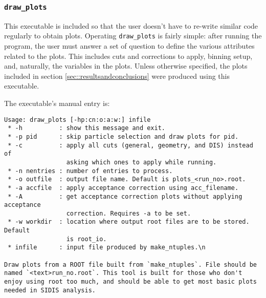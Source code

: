 \subsubsection{\texttt{draw\_plots}}
    This executable is included so that the user doesn't have to re-write similar code regularly to obtain plots.
    Operating \texttt{draw\_plots} is fairly simple: after running the program, the user must answer a set of question to define the various attributes related to the plots.
    This includes cuts and corrections to apply, binning setup, and, naturally, the variables in the plots.
    Unless otherwise specified, the plots included in section \ref{sec::resultsandconclusions} were produced using this executable.

    The executable's manual entry is:
    \begin{lstlisting}
Usage: draw_plots [-hp:cn:o:a:w:] infile
 * -h          : show this message and exit.
 * -p pid      : skip particle selection and draw plots for pid.
 * -c          : apply all cuts (general, geometry, and DIS) instead of
                 asking which ones to apply while running.
 * -n nentries : number of entries to process.
 * -o outfile  : output file name. Default is plots_<run_no>.root.
 * -a accfile  : apply acceptance correction using acc_filename.
 * -A          : get acceptance correction plots without applying acceptance
                 correction. Requires -a to be set.
 * -w workdir  : location where output root files are to be stored. Default
                 is root_io.
 * infile      : input file produced by make_ntuples.\n

Draw plots from a ROOT file built from `make_ntuples`. File should be named `<text>run_no.root`. This tool is built for those who don't enjoy using root too much, and should be able to get most basic plots needed in SIDIS analysis.
    \end{lstlisting}
